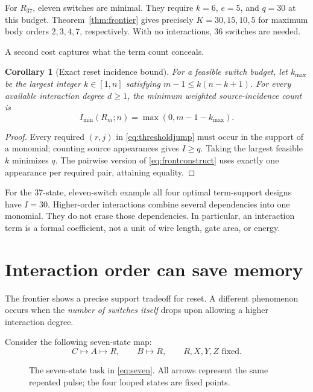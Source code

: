 \documentclass[12pt,letterpaper]{article}
\newtheorem{corollary}[theorem]{Corollary}
\theoremstyle{definition}\newtheorem{definition}[theorem]{Definition}
\theoremstyle{remark}\newtheorem{remark}[theorem]{Remark}
\begin{document}
For $R_{37}$, eleven switches are minimal. They require $k=6$, $e=5$, and $q=30$ at this budget. Theorem~\ref{thm:frontier} gives precisely $K=30,15,10,5$ for maximum body orders $2,3,4,7$, respectively. With no interactions, 36 switches are needed.

A second cost captures what the term count conceals.
\begin{corollary}[Exact reset incidence bound]\label{cor:incidence}
For a feasible switch budget, let $k_{\max}$ be the largest integer $k\in[1,n]$ satisfying $m-1\le k(n-k+1)$. For every available interaction degree $d\ge1$, the minimum weighted source-incidence count is
\begin{equation}\label{eq:incidence}
\boxed{I_{\min}(R_m;n)=\max(0,m-1-k_{\max}).}
\end{equation}
\end{corollary}
\begin{proof}
Every required $(r,j)$ in \eqref{eq:thresholdjump} must occur in the support of a monomial; counting source appearances gives $I\ge q$. Taking the largest feasible $k$ minimizes $q$. The pairwise version of \eqref{eq:frontconstruct} uses exactly one appearance per required pair, attaining equality.
\end{proof}

For the 37-state, eleven-switch example all four optimal term-support designs have $I=30$. Higher-order interactions combine several dependencies into one monomial. They do not erase those dependencies. In particular, an interaction term is a formal coefficient, not a unit of wire length, gate area, or energy.

\section{Interaction order can save memory}\label{sec:separation}
The frontier shows a precise support tradeoff for reset. A different phenomenon occurs when the \emph{number of switches itself} drops upon allowing a higher interaction degree.

Consider the following seven-state map:
\begin{equation}\label{eq:seven}
 C\mapsto A\mapsto R,\qquad B\mapsto R,\qquad R,X,Y,Z\text{ fixed}.
\end{equation}
\begin{figure}[ht]
\centering\resizebox{\linewidth}{!}{}
\caption{The seven-state task in \eqref{eq:seven}. All arrows represent the same repeated pulse; the four looped states are fixed points.}
\label{fig:seven}
\end{figure}
\end{document}
